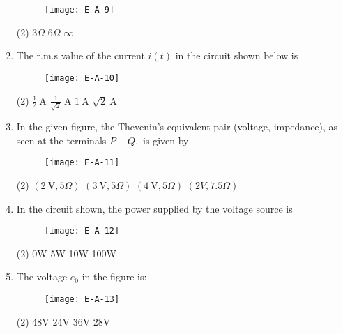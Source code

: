 \begin{enumerate}
	\begin{figure}[H]
		\centering
		\texttt{[image: E-A-9]}
	\end{figure}
	 \begin{tasks}(2)
		\task[\textbf{b.}]$3\Omega$
		\task[\textbf{c.}]$6\Omega$
		\task[\textbf{d.}] $\infty$
	\end{tasks}
	\item The r.m.s value of the current $i(t)$ in the circuit shown below is 
	\begin{figure}[H]
		\centering
		\texttt{[image: E-A-10]}
		\caption{}
		\label{}
	\end{figure}
	 \begin{tasks}(2)
		\task[\textbf{a.}]$\frac{1}{2} \mathrm{~A}$
		\task[\textbf{b.}] $\frac{1}{\sqrt{2}} \mathrm{~A}$
		\task[\textbf{c.}]$1 \mathrm{~A}$
		\task[\textbf{d.}]  $\sqrt{2} \mathrm{~A}$
	\end{tasks}
\item In the given figure, the Thevenin's equivalent pair (voltage, impedance), as seen at the terminals $P-Q,$ is given by
\begin{figure}[H]
	\centering
	\texttt{[image: E-A-11]}
	\caption{}
	\label{}
\end{figure}
	 \begin{tasks}(2)
		\task[\textbf{a.}]$(2 \mathrm{~V}, 5 \Omega)$
		\task[\textbf{b.}]$(3 \mathrm{~V}, 5 \Omega)$
		\task[\textbf{c.}] $(4 \mathrm{~V}, 5 \Omega)$
		\task[\textbf{d.}] $(2 V, 7.5 \Omega)$
	\end{tasks}
	\item In the circuit shown, the power supplied by the voltage source is
	\begin{figure}[H]
		\centering
		\texttt{[image: E-A-12]}
		\caption{}
		\label{}
	\end{figure}
 \begin{tasks}(2)
	\task[\textbf{a.}]0W
	\task[\textbf{b.}]5W
	\task[\textbf{c.}]10W
	\task[\textbf{d.}]100W
\end{tasks}
	\item The voltage $e_{0}$ in the figure is:
	\begin{figure}[H]
		\centering
		\texttt{[image: E-A-13]}
		\caption{}
		\label{}
	\end{figure}
	 \begin{tasks}(2)
		\task[\textbf{a.}]48V
		\task[\textbf{b.}]24V
		\task[\textbf{c.}]36V
		\task[\textbf{d.}]28V

\end{tasks}
\end{enumerate}
